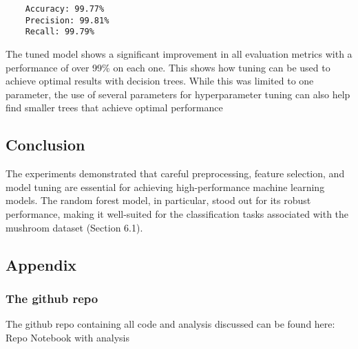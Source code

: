 \documentclass{article}
\begin{document}
\begin{lstlisting}
    Accuracy: 99.77%
    Precision: 99.81%
    Recall: 99.79%
\end{lstlisting}

The tuned model shows a significant improvement in all evaluation metrics with a performance of over 99\% on each one. This shows how tuning can be used to achieve optimal results with decision trees. While this was limited to one parameter, the use of several parameters for hyperparameter tuning can also help find smaller trees that achieve optimal performance


\subsection{Conclusion}

The experiments demonstrated that careful preprocessing, feature selection, and model tuning are essential for achieving high-performance machine learning models. The random forest model, in particular, stood out for its robust performance, making it well-suited for the classification tasks associated with the mushroom dataset (Section 6.1).

\subsection{Appendix}

\subsubsection{The github repo}
The github repo containing all code and analysis discussed can be found here:
Repo
Notebook with analysis
\end{document}
